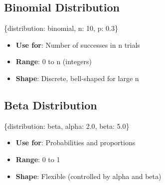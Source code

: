 \documentclass[
  letterpaper,
]{scrbook}
\newenvironment{Shaded}{\begin{snugshade}}{\end{snugshade}}
\newcommand{\DecValTok}[1]{\textcolor[rgb]{0.68,0.00,0.00}{#1}}
\newcommand{\FloatTok}[1]{\textcolor[rgb]{0.68,0.00,0.00}{#1}}
\newcommand{\NormalTok}[1]{\textcolor[rgb]{0.00,0.23,0.31}{#1}}
\newcommand{\StringTok}[1]{\textcolor[rgb]{0.13,0.47,0.30}{#1}}
\providecommand{\tightlist}{%
  \setlength{\itemsep}{0pt}\setlength{\parskip}{0pt}}
\begin{document}
\subsection{Binomial Distribution}\label{binomial-distribution}

\begin{Shaded}
\begin{Highlighting}[]
\NormalTok{\{}\StringTok{\textquotesingle{}distribution\textquotesingle{}}\NormalTok{: }\StringTok{\textquotesingle{}binomial\textquotesingle{}}\NormalTok{, }\StringTok{\textquotesingle{}n\textquotesingle{}}\NormalTok{: }\DecValTok{10}\NormalTok{, }\StringTok{\textquotesingle{}p\textquotesingle{}}\NormalTok{: }\FloatTok{0.3}\NormalTok{\}}
\end{Highlighting}
\end{Shaded}

\begin{itemize}
\tightlist
\item
  \textbf{Use for}: Number of successes in n trials
\item
  \textbf{Range}: 0 to n (integers)
\item
  \textbf{Shape}: Discrete, bell-shaped for large n
\end{itemize}

\subsection{Beta Distribution}\label{beta-distribution}

\begin{Shaded}
\begin{Highlighting}[]
\NormalTok{\{}\StringTok{\textquotesingle{}distribution\textquotesingle{}}\NormalTok{: }\StringTok{\textquotesingle{}beta\textquotesingle{}}\NormalTok{, }\StringTok{\textquotesingle{}alpha\textquotesingle{}}\NormalTok{: }\FloatTok{2.0}\NormalTok{, }\StringTok{\textquotesingle{}beta\textquotesingle{}}\NormalTok{: }\FloatTok{5.0}\NormalTok{\}}
\end{Highlighting}
\end{Shaded}

\begin{itemize}
\tightlist
\item
  \textbf{Use for}: Probabilities and proportions
\item
  \textbf{Range}: 0 to 1
\item
  \textbf{Shape}: Flexible (controlled by alpha and beta)
\end{itemize}
\end{document}

